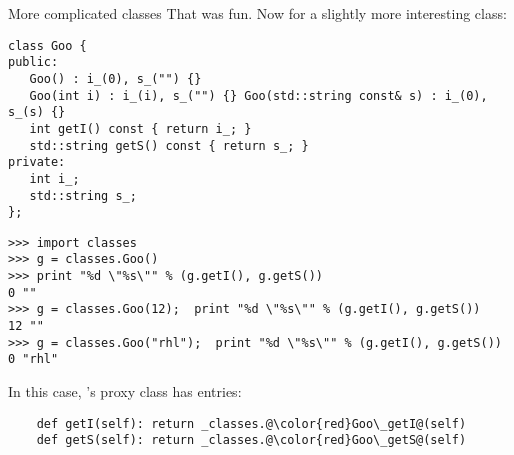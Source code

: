 \documentclass[10pt, t]{beamer}
\let\texttt=\graytt
\begin{document}
\begin{frame}[fragile,label=sec-6-13]{More complicated classes}
 That was fun.  Now for a slightly more interesting class:

\lstset{language=Python,label= ,caption= ,numbers=none}
\begin{lstlisting}
class Goo {
public:
   Goo() : i_(0), s_("") {}
   Goo(int i) : i_(i), s_("") {} Goo(std::string const& s) : i_(0), s_(s) {}
   int getI() const { return i_; }
   std::string getS() const { return s_; }
private:
   int i_;
   std::string s_;
};
\end{lstlisting}

\pause
\lstset{language=Python,label= ,caption= ,numbers=none}
\begin{lstlisting}
>>> import classes
>>> g = classes.Goo()
>>> print "%d \"%s\"" % (g.getI(), g.getS())
0 ""
>>> g = classes.Goo(12);  print "%d \"%s\"" % (g.getI(), g.getS())
12 ""
>>> g = classes.Goo("rhl");  print "%d \"%s\"" % (g.getI(), g.getS())
0 "rhl"
\end{lstlisting}
\pause

In this case, \texttt{Goo}'s proxy class has entries:
\lstset{language=Python,label= ,caption= ,numbers=none}
\begin{lstlisting}
    def getI(self): return _classes.@\color{red}Goo\_getI@(self)
    def getS(self): return _classes.@\color{red}Goo\_getS@(self)
\end{lstlisting}
\end{frame}

%

%
\end{document}
